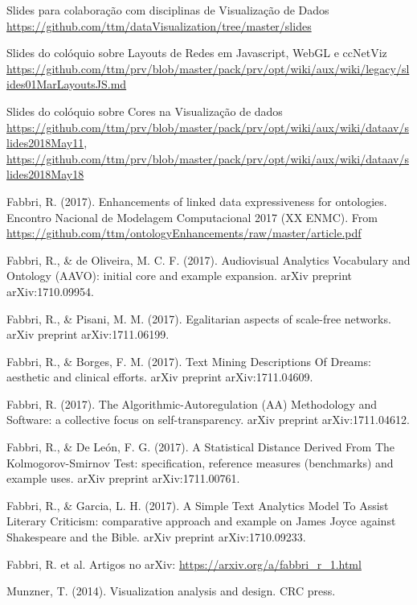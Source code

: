 \documentclass[a4paper, 11pt]{article}
\begin{document}
\begin{thebibliography}{99}
  Slides para colaboração com disciplinas de Visualização de Dados \url{https://github.com/ttm/dataVisualization/tree/master/slides}

  Slides do colóquio sobre Layouts de Redes em Javascript, WebGL e ccNetViz \url{https://github.com/ttm/prv/blob/master/pack/prv/opt/wiki/aux/wiki/legacy/slides01MarLayoutsJS.md}

  Slides do colóquio sobre Cores na Visualização de dados \url{https://github.com/ttm/prv/blob/master/pack/prv/opt/wiki/aux/wiki/dataav/slides2018May11}, \url{https://github.com/ttm/prv/blob/master/pack/prv/opt/wiki/aux/wiki/dataav/slides2018May18}

	Fabbri, R. (2017). Enhancements of linked data expressiveness for ontologies.
  Encontro Nacional de Modelagem Computacional 2017 (XX ENMC).  From \url{https://github.com/ttm/ontologyEnhancements/raw/master/article.pdf}

	Fabbri, R., \& de Oliveira, M. C. F. (2017). Audiovisual Analytics Vocabulary and Ontology (AAVO): initial core and example expansion. arXiv preprint arXiv:1710.09954.

        Fabbri, R., \& Pisani, M. M. (2017). Egalitarian aspects of scale-free networks. arXiv preprint arXiv:1711.06199.

  Fabbri, R., \& Borges, F. M. (2017). Text Mining Descriptions Of Dreams: aesthetic and clinical efforts. arXiv preprint arXiv:1711.04609.

  Fabbri, R. (2017). The Algorithmic-Autoregulation (AA) Methodology and Software: a collective focus on self-transparency. arXiv preprint arXiv:1711.04612.
  
  Fabbri, R., \& De León, F. G. (2017). A Statistical Distance Derived From The Kolmogorov-Smirnov Test: specification, reference measures (benchmarks) and example uses. arXiv preprint arXiv:1711.00761.

  Fabbri, R., \& Garcia, L. H. (2017). A Simple Text Analytics Model To Assist Literary Criticism: comparative approach and example on James Joyce against Shakespeare and the Bible. arXiv preprint arXiv:1710.09233.

  Fabbri, R. et al. Artigos no arXiv: \url{https://arxiv.org/a/fabbri_r_1.html}

	Munzner, T. (2014). Visualization analysis and design. CRC press.


\end{thebibliography}
\end{document}
